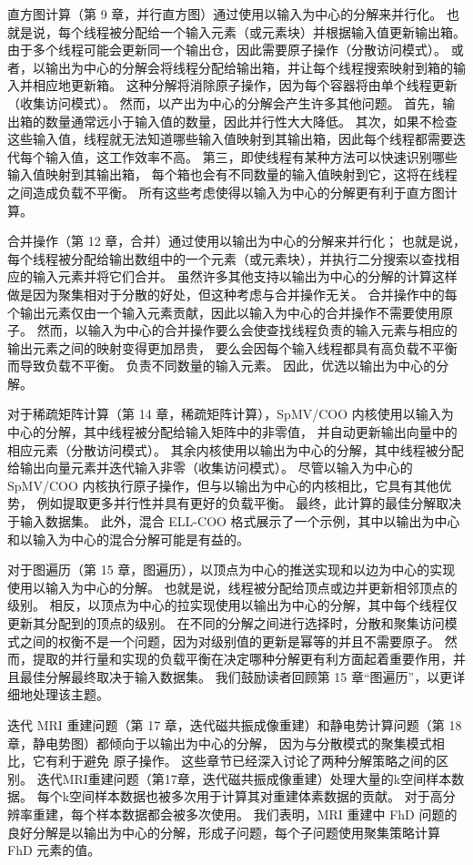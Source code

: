 直方图计算（第 9 章，并行直方图）通过使用以输入为中心的分解来并行化。 
也就是说，每个线程被分配给一个输入元素（或元素块）并根据输入值更新输出箱。 
由于多个线程可能会更新同一个输出仓，因此需要原子操作（分散访问模式）。 或
者，以输出为中心的分解会将线程分配给输出箱，并让每个线程搜索映射到箱的输入并相应地更新箱。 
这种分解将消除原子操作，因为每个容器将由单个线程更新（收集访问模式）。 
然而，以产出为中心的分解会产生许多其他问题。 首先，输出箱的数量通常远小于输入值的数量，因此并行性大大降低。 
其次，如果不检查这些输入值，线程就无法知道哪些输入值映射到其输出箱，因此每个线程都需要迭代每个输入值，这工作效率不高。 
第三，即使线程有某种方法可以快速识别哪些输入值映射到其输出箱，
每个箱也会有不同数量的输入值映射到它，这将在线程之间造成负载不平衡。 所有这些考虑使得以输入为中心的分解更有利于直方图计算。

合并操作（第 12 章，合并）通过使用以输出为中心的分解来并行化； 
也就是说，每个线程被分配给输出数组中的一个元素（或元素块），并执行二分搜索以查找相应的输入元素并将它们合并。 
虽然许多其他支持以输出为中心的分解的计算这样做是因为聚集相对于分散的好处，但这种考虑与合并操作无关。 
合并操作中的每个输出元素仅由一个输入元素贡献，因此以输入为中心的合并操作不需要使用原子。 
然而，以输入为中心的合并操作要么会使查找线程负责的输入元素与相应的输出元素之间的映射变得更加昂贵，
要么会因每个输入线程都具有高负载不平衡而导致负载不平衡。 负责不同数量的输入元素。 因此，优选以输出为中心的分解。

对于稀疏矩阵计算（第 14 章，稀疏矩阵计算），SpMV/COO 内核使用以输入为中心的分解，其中线程被分配给输入矩阵中的非零值，
并自动更新输出向量中的相应元素（分散访问模式）。 
其余内核使用以输出为中心的分解，其中线程被分配给输出向量元素并迭代输入非零（收集访问模式）。 
尽管以输入为中心的 SpMV/COO 内核执行原子操作，但与以输出为中心的内核相比，它具有其他优势，
例如提取更多并行性并具有更好的负载平衡。 最终，此计算的最佳分解取决于输入数据集。 
此外，混合 ELL-COO 格式展示了一个示例，其中以输出为中心和以输入为中心的混合分解可能是有益的。

对于图遍历（第 15 章，图遍历），以顶点为中心的推送实现和以边为中心的实现使用以输入为中心的分解。 
也就是说，线程被分配给顶点或边并更新相邻顶点的级别。 
相反，以顶点为中心的拉实现使用以输出为中心的分解，其中每个线程仅更新其分配到的顶点的级别。 
在不同的分解之间进行选择时，分散和聚集访问模式之间的权衡不是一个问题，因为对级别值的更新是幂等的并且不需要原子。 
然而，提取的并行量和实现的负载平衡在决定哪种分解更有利方面起着重要作用，并且最佳分解最终取决于输入数据集。 
我们鼓励读者回顾第 15 章“图遍历”，以更详细地处理该主题。

迭代 MRI 重建问题（第 17 章，迭代磁共振成像重建）和静电势计算问题（第 18 章，静电势图）都倾向于以输出为中心的分解，
因为与分散模式的聚集模式相比，它有利于避免 原子操作。 这些章节已经深入讨论了两种分解策略之间的区别。 
迭代MRI重建问题（第17章，迭代磁共振成像重建）处理大量的k空间样本数据。 
每个k空间样本数据也被多次用于计算其对重建体素数据的贡献。 对于高分辨率重建，每个样本数据都会被多次使用。 
我们表明，MRI 重建中 FhD 问题的良好分解是以输出为中心的分解，形成子问题，每个子问题使用聚集策略计算 FhD 元素的值。

